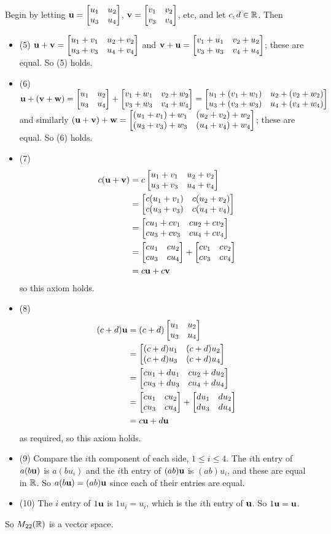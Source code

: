 \begin{myexample}
Begin
by letting $\uu = \mat{u_1 & u_2 \\ u_3 & u_4}$, $\vv = \mat{v_1&v_2\\v_3&v_4}$, etc, and let $c,d\in \R$.  Then
\begin{itemize}
\item (5) $\uu + \vv = \mat{u_1+v_1 & u_2+v_2\\ u_3+v_3 & u_4+v_4}$ and
$\vv + \uu = \mat{v_1+u_1 & v_2+u_2\\ v_3+u_3 & v_4+u_4}$; these are
equal.  So (5) holds.
\item (6) $\uu + (\vv + \ww) = \mat{u_1 & u_2 \\ u_3 & u_4}+ \mat{v_1+w_1 & v_2+w_2\\ v_3+w_3 & v_4+w_4} = \mat{ u_1 + (v_1+w_1) & u_2+(v_2+w_2) \\ u_3 + (v_3+w_3) & u_4+(v_4+w_4)}$ and similarly
$(\uu + \vv) + \ww =  \mat{ (u_1 + v_1)+w_1 & (u_2+v_2)+w_2 \\ (u_3 + v_3)+w_3 & (u_4+v_4)+w_4}$; these are equal.  So (6) holds.
\item (7) 
\begin{align*}
c(\uu + \vv) &= c \mat{u_1+v_1 & u_2+v_2\\ u_3+v_3 & u_4+v_4} \\
&= \mat{c(u_1+v_1) & c(u_2+v_2)\\ c(u_3+v_3) & c(u_4+v_4)} \\
&= \mat{cu_1+cv_1 &  cu_2+cv_2\\ cu_3+cv_3 & cu_4+cv_4}\\
&= \mat{cu_1 & cu_2 \\ cu_3 & cu_4}+ \mat{cv_1&cv_2\\cv_3&cv_4}\\
&= c\uu + c\vv
\end{align*} 
so this axiom holds.
\item (8) \begin{align*}
(c+d)\uu &= (c+d)\mat{u_1 & u_2 \\ u_3 & u_4}\\
&= \mat{(c+d)u_1 & (c+d)u_2 \\ (c+d)u_3 & (c+d)u_4}\\
&= \mat{cu_1+du_1 & cu_2+du_2 \\ cu_3+du_3 & cu_4+du_4}\\
&= \mat{cu_1 & cu_2 \\ cu_3 & cu_4}+\mat{du_1 & du_2 \\ du_3 & du_4}\\
&= c\uu + d\uu
\end{align*}
as required, so this axiom holds.
\item (9) Compare the $i$th component of each side, $1 \leq i \leq 4$.  
The $i$th
entry of $a(b\uu)$ is $a(bu_i)$ and the $i$th entry of $(ab)\uu$ is
$(ab)u_i$, and these are equal in $\R$.  So $a(b\uu) = (ab)\uu$
since each of their entries are equal.
\item (10) The $i$ entry of $1\uu$ is $1u_i = u_i$, which is the
$i$th entry of $\uu$.  So $1\uu = \uu$.
\end{itemize}

So $M_{22}(\R)$ is a vector space.
\end{myexample}

